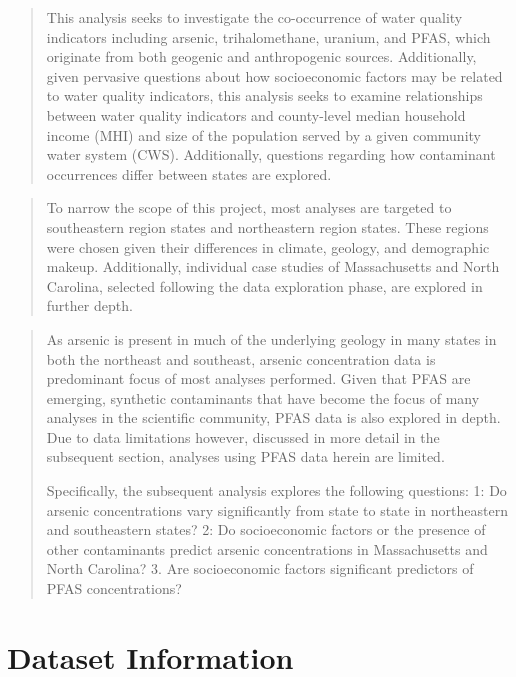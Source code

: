 \documentclass[12pt,]{article}
\begin{document}
\begin{quote}
This analysis seeks to investigate the co-occurrence of water quality
indicators including arsenic, trihalomethane, uranium, and PFAS, which
originate from both geogenic and anthropogenic sources. Additionally,
given pervasive questions about how socioeconomic factors may be related
to water quality indicators, this analysis seeks to examine
relationships between water quality indicators and county-level median
household income (MHI) and size of the population served by a given
community water system (CWS). Additionally, questions regarding how
contaminant occurrences differ between states are explored.
\end{quote}

\begin{quote}
To narrow the scope of this project, most analyses are targeted to
southeastern region states and northeastern region states. These regions
were chosen given their differences in climate, geology, and demographic
makeup. Additionally, individual case studies of Massachusetts and North
Carolina, selected following the data exploration phase, are explored in
further depth.
\end{quote}

\begin{quote}
As arsenic is present in much of the underlying geology in many states
in both the northeast and southeast, arsenic concentration data is
predominant focus of most analyses performed. Given that PFAS are
emerging, synthetic contaminants that have become the focus of many
analyses in the scientific community, PFAS data is also explored in
depth. Due to data limitations however, discussed in more detail in the
subsequent section, analyses using PFAS data herein are limited.

Specifically, the subsequent analysis explores the following questions:
1: Do arsenic concentrations vary significantly from state to state in
northeastern and southeastern states? 2: Do socioeconomic factors or the
presence of other contaminants predict arsenic concentrations in
Massachusetts and North Carolina? 3. Are socioeconomic factors
significant predictors of PFAS concentrations?
\end{quote}

\newpage

\hypertarget{dataset-information}{%
\section{Dataset Information}\label{dataset-information}}
\end{document}
